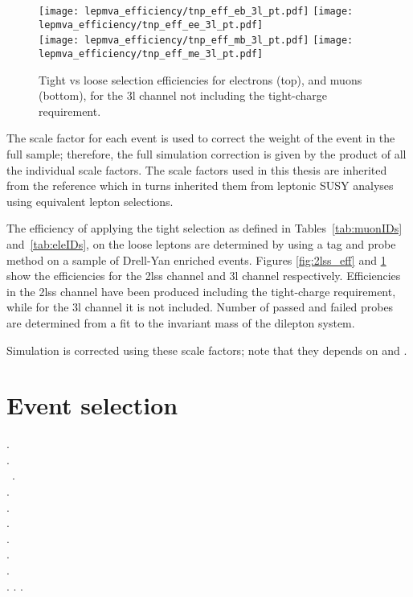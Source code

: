 \begin{figure}[!ht]
\centering
  \texttt{[image: lepmva\_efficiency/tnp\_eff\_eb\_3l\_pt.pdf]}
  \texttt{[image: lepmva\_efficiency/tnp\_eff\_ee\_3l\_pt.pdf]}\\
  \texttt{[image: lepmva\_efficiency/tnp\_eff\_mb\_3l\_pt.pdf]}
  \texttt{[image: lepmva\_efficiency/tnp\_eff\_me\_3l\_pt.pdf]}
\caption[Tight vs loose lepton selection efficiencies in the 3l channel.]{Tight vs loose selection efficiencies for electrons (top), and muons (bottom), for the 3l channel not including the tight-charge requirement.}
\label{fig:3l_eff}
\end{figure}

The scale factor for each event is used to correct the weight of the event in the full sample; therefore, the full simulation correction is given by the product of all the individual scale factors. The scale factors used in this thesis are inherited from the reference \cite{CMS_AN_2017-029} which in turns inherited them from leptonic SUSY analyses using equivalent lepton selections.

The efficiency of applying the tight selection as defined in Tables~\ref{tab:muonIDs} and~\ref{tab:eleIDs}, on the loose leptons are determined by using a tag and probe method on a sample of Drell-Yan enriched events. Figures \ref{fig:2lss_eff} and \ref{fig:3l_eff} show the efficiencies for the 2lss channel and 3l channel respectively. Efficiencies in the 2lss channel have been produced including the tight-charge requirement, while for the 3l channel it is not included. Number of passed and failed probes are determined from a fit to the invariant mass of the dilepton system.

Simulation is corrected using these scale factors; note that they depends on \etac and \pt.   


\section{Event selection}













.\\
.\\\
.\\
.\\
.\\
.\\
.\\
.\\
.\\
.
.
.




